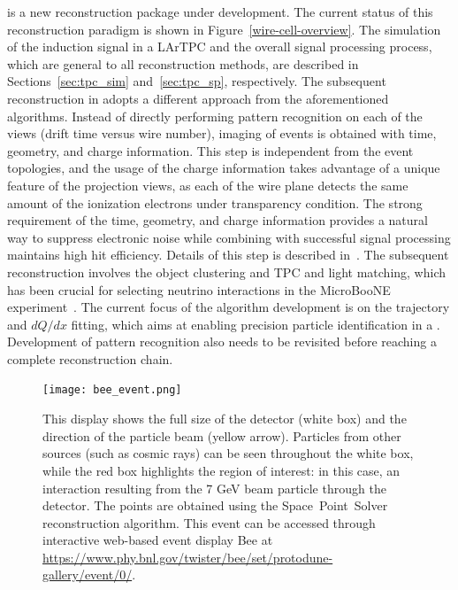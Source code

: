  is a new reconstruction package under development. The current 
status of this reconstruction paradigm is shown in Figure~\ref{wire-cell-overview}. The 
simulation of the induction signal in a LArTPC and the overall signal processing process,
which are general to all reconstruction methods, are described in Sections~\ref{sec:tpc_sim} 
and~\ref{sec:tpc_sp}, respectively. The subsequent reconstruction in  adopts 
a different approach from the aforementioned algorithms. Instead of directly performing pattern 
recognition on each of the \twod views (drift time versus wire number), \threed imaging of events 
is obtained with time, geometry, and charge information. This step is independent from 
the event topologies, and the usage of the charge information takes advantage of a unique 
feature of the projection views, as each of the wire plane detects the same 
amount of the ionization electrons under transparency condition. The strong requirement of the time, geometry, and charge 
information provides a natural way to suppress electronic noise
 while combining with successful signal processing maintains high hit efficiency. Details of this step is described in~\cite{Qian:2018qbv}. The subsequent reconstruction involves the object clustering and
TPC and light matching, which has been crucial for selecting neutrino interactions in the 
MicroBooNE experiment~\cite{uboone_wc_note}. The current focus of the  algorithm 
development is on the trajectory and $dQ/dx$ fitting, which aims at enabling precision particle
identification in a \lartpc. %
Development of \threed pattern recognition also needs
to be revisited before reaching a complete reconstruction chain. 


\begin{figure}[!ht]
\centering
 \texttt{[image: bee\_event.png]}
\caption{This \threed display shows the full size of the  detector (white box) and 
the direction of the particle beam (yellow arrow). Particles from other sources (such as cosmic rays) 
can be seen throughout the white box, while the red box highlights the region of interest: 
in this case, an interaction resulting from the 7 GeV beam particle through the detector. 
The \threed points are obtained using the Space~Point~Solver reconstruction algorithm. This event
can be accessed through interactive web-based event display Bee at \url{https://www.phy.bnl.gov/twister/bee/set/protodune-gallery/event/0/}.}
\label{wire-cell-bee}
\end{figure}


